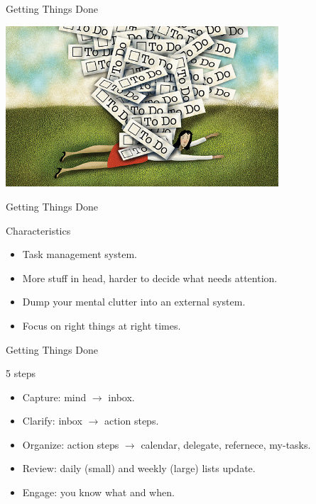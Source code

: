 \begin{frame}{Getting Things Done}
  \begin{center}
    \includegraphics[height=6cm]{img/gtd.png}
  \end{center}
\end{frame}

\begin{frame}{Getting Things Done}
  \begin{block}{Characteristics}
    \begin{itemize}
      \item Task management system.
      \item More stuff in head, harder to decide what needs attention.
      \item Dump your mental clutter into an external system.
      \item Focus on right things at right times.
    \end{itemize}
  \end{block}
\end{frame}

\begin{frame}{Getting Things Done}
  \begin{block}{5 steps}
    \begin{itemize}
      \item Capture: mind $\rightarrow$ inbox.
      \item Clarify: inbox $\rightarrow$ action steps.
      \item Organize: action steps $\rightarrow$ calendar, delegate, refernece, my-tasks.
      \item Review: daily (small) and weekly (large) lists update.
      \item Engage: you know what and when.
    \end{itemize}
  \end{block}
\end{frame}


